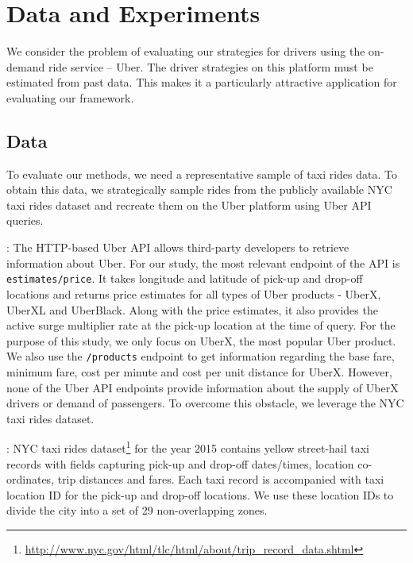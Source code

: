 
\section{Data and Experiments}
\label{sec:experiments}

We consider the problem of evaluating our strategies for drivers using the on-demand ride service -- Uber. The driver strategies on this platform must be estimated from past data. This makes it a particularly attractive application for evaluating our framework.

\subsection{Data}
\label{sec:data}
To evaluate our methods, we need a representative sample of taxi rides data. To obtain this data, we strategically sample rides from the publicly available NYC taxi rides dataset and recreate them on the Uber platform using Uber API queries.

: 
The HTTP-based Uber API allows third-party developers to retrieve information about Uber. For our study, the most relevant endpoint of the API is \texttt{estimates/price}. It takes longitude and latitude of pick-up and drop-off locations and returns price estimates for all types of Uber products - UberX, UberXL and UberBlack. Along with the price estimates, it also provides the active surge multiplier rate at the pick-up location at the time of query. For the purpose of this study, we only focus on UberX, the most popular Uber product. We also use the \texttt{/products} endpoint to get information regarding the base fare, minimum fare, cost per minute and cost per unit distance for UberX. However, none of the Uber API endpoints provide information about the supply of UberX drivers or demand of passengers. To overcome this obstacle, we leverage the NYC taxi rides dataset.

:
NYC taxi rides dataset\footnote{\url{http://www.nyc.gov/html/tlc/html/about/trip_record_data.shtml}} for the year 2015 contains yellow street-hail taxi records with fields capturing pick-up and drop-off dates/times, location co-ordinates, trip distances and fares. Each taxi record is accompanied with taxi location ID for the pick-up and drop-off locations. We use these location IDs to divide the city into a set of 29 non-overlapping zones.

